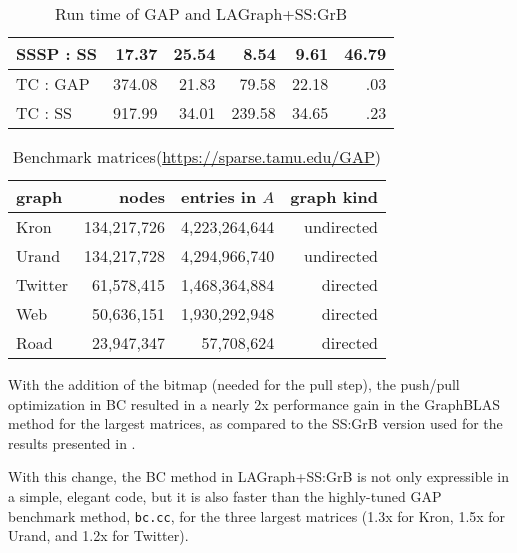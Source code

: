 \begin{table}
\begin{center}
\begin{tabular}{|l|rrrrr|}
SSSP : SS      &  17.37    &  25.54    &   8.54     &  9.61   &   46.79  \\     %
\hline
TC   : GAP     & 374.08    &  21.83    &  79.58     & 22.18   &     .03  \\
TC   : SS      & 917.99    &  34.01    & 239.58     & 34.65   &     .23  \\     %
\hline
\end{tabular}
\caption{Run time of GAP and LAGraph+SS:GrB
\label{table:results}}
\end{center}
\end{table}

\begin{table}
\begin{center}
\begin{tabular}{|l|rrr|}
\hline
graph   & nodes        & entries in $A$ & graph kind \\
\hline
Kron    & 134,217,726 &  4,223,264,644 &  undirected   \\
Urand   & 134,217,728 &  4,294,966,740 &  undirected   \\
Twitter &  61,578,415 &  1,468,364,884 &  directed     \\
Web     &  50,636,151 &  1,930,292,948 &  directed     \\
Road    &  23,947,347 &     57,708,624 &  directed     \\
\hline
\end{tabular}
\caption{Benchmark matrices\label{table:matrices}
(\url{https://sparse.tamu.edu/GAP})}
\end{center}
\end{table}


With the addition of the bitmap (needed for the pull step), the
push/pull optimization in BC resulted in a nearly 2x performance gain in the
GraphBLAS method for the largest matrices, as compared to the SS:GrB version
used for the results presented in \cite{DBLP:conf/iiswc/AzadABBCDDDDFGG20}.

With this change, the BC method in LAGraph+SS:GrB is not only expressible in a
simple, elegant code, but it is also faster than the highly-tuned GAP benchmark
method, \verb'bc.cc', for the three largest matrices (1.3x for Kron, 1.5x for
Urand, and 1.2x for Twitter).

